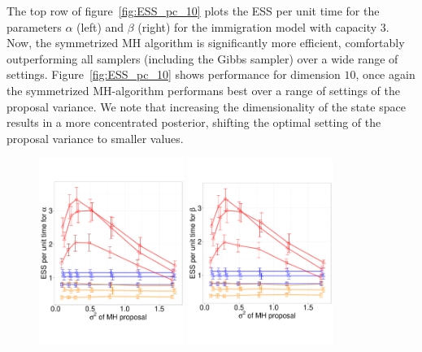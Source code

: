 { The top row of figure~\ref{fig:ESS_pc_10} plots the ESS per unit time for the 
 parameters $\alpha$ (left) and $\beta$ (right) for the immigration model with 
 capacity $3$.  Now, the symmetrized MH algorithm is significantly 
 more efficient, comfortably outperforming all samplers (including the Gibbs 
 sampler) over a wide range of settings. %
 Figure~\ref{fig:ESS_pc_10} shows performance for dimension
 $10$, once again the symmetrized MH-algorithm performans best over a 
 range of settings of the proposal variance. We note that increasing the
 dimensionality of the state space results in a more concentrated posterior,
 shifting the optimal setting of the proposal variance to smaller values.
  \begin{figure}%
  \centering
  \begin{minipage}[!hp]{0.9\linewidth}
  \centering
    \includegraphics [width=0.42\textwidth, angle=0]{figs/pc_3_alpha.pdf}
    \hspace{.2 in}
    \includegraphics [width=0.42\textwidth, angle=0]{figs/pc_3_beta.pdf}

\end{minipage}
\end{figure}}
